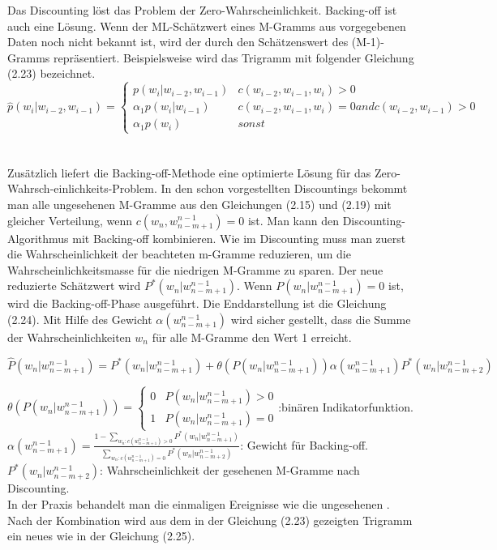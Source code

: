 Das Discounting l\"ost das Problem der Zero-Wahrscheinlichkeit. Backing-off ist auch eine L\"osung. Wenn der ML-Sch\"atzwert eines M-Gramms aus vorgegebenen Daten noch nicht bekannt ist, wird der durch den Sch\"atzenswert des (M-1)-Gramms repr\"asentiert. Beispielsweise wird das Trigramm mit folgender Gleichung (2.23) bezeichnet.
\begin{equation}
\label{equation:backing_off_01}
	\hat{p}(w_{i}|w_{i-2},w_{i-1})=
	\begin{cases}
			p(w_{i}|w_{i-2},w_{i-1}) & c(w_{i-2},w_{i-1},w_{i})>0 \\
			\alpha_{1}p(w_{i}|w_{i-1})& c(w_{i-2},w_{i-1},w_{i})=0 and c(w_{i-2},w_{i-1})>0 \\
			\alpha_{1}p(w_{i}) & sonst 
	\end{cases}
\end{equation}
\\
\\
Zus\"atzlich liefert die Backing-off-Methode eine optimierte L\"osung f\"ur das Zero-Wahrsch-einlichkeits-Problem. In den schon vorgestellten Discountings bekommt man alle ungesehenen M-Gramme aus den Gleichungen (2.15) und (2.19) mit gleicher Verteilung, wenn $c(w_{n},w_{n-m+1}^{n-1})=0$ ist. Man kann den Discounting-Algorithmus mit Backing-off kombinieren. Wie im Discounting muss man zuerst die Wahrscheinlichkeit der beachteten m-Gramme reduzieren, um die Wahrscheinlichkeitsmasse f\"ur die niedrigen M-Gramme zu sparen. Der neue  reduzierte Sch\"atzwert wird $P^{*}(w_{n}|w_{n-m+1}^{n-1})$. Wenn $P(w_{n}|w_{n-m+1}^{n-1})=0$ ist, wird die Backing-off-Phase ausgef\"uhrt.  Die Enddarstellung ist die Gleichung (2.24).  Mit  Hilfe des Gewicht $\alpha(w_{n-m+1}^{n-1})$ wird sicher gestellt, dass die Summe der Wahrscheinlichkeiten $w_{n}$ f\"ur alle M-Gramme den Wert 1 erreicht.

\begin{equation}
\label{equation:backing_off_02}
\hat{P}(w_{n}|w_{n-m+1}^{n-1})=P^{*}(w_{n}|w_{n-m+1}^{n-1})+\theta(P(w_{n}|w_{n-m+1}^{n-1}))\alpha(w_{n-m+1}^{n-1})P^{*}(w_{n}|w_{n-m+2}^{n-1})
\end{equation}

$\theta(P(w_{n}|w_{n-m+1}^{n-1}))=\begin{cases} 0 & P(w_{n}|w_{n-m+1}^{n-1})>0 \\ 1 & P(w_{n}|w_{n-m+1}^{n-1})= 0 \end{cases}$:bin\"aren Indikatorfunktion.\\
$\alpha(w_{n-m+1}^{n-1})=\frac{1-\sum_{w_{n}:c(w_{n-m+1}^{n-1})>0}P^{*}(w_{n}|w_{n-m+1}^{n-1})}{\sum_{w_{n}:c(w_{n-m+1}^{n-1})=0}P^{*}(w_{n}|w_{n-m+2}^{n-1})}$: Gewicht f\"ur Backing-off.\\
$P^{*}(w_{n}|w_{n-m+2}^{n-1})$: Wahrscheinlichkeit der gesehenen M-Gramme nach Discounting.\\
In der Praxis behandelt man die einmaligen Ereignisse wie die ungesehenen . Nach der Kombination wird aus dem in der Gleichung (2.23) gezeigten Trigramm ein neues wie in der Gleichung (2.25).

